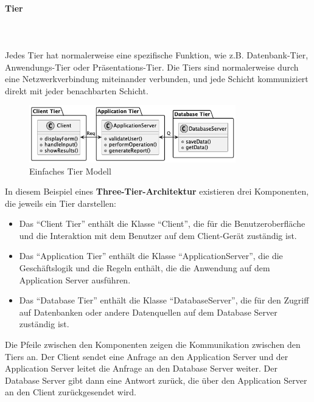 \documentclass[../vs-script-first-v01.tex]{subfiles}
\begin{document}
\paragraph{Tier}\mbox{}\\
\mbox{}\\
Jedes Tier hat normalerweise eine spezifische Funktion, wie z.B. Datenbank-Tier, Anwendungs-Tier oder Präsentations-Tier. Die Tiers sind normalerweise durch eine Netzwerkverbindung miteinander verbunden, und jede Schicht kommuniziert direkt mit jeder benachbarten Schicht.
\begin{figure}[!h]
  \centering
  \includegraphics[width=0.80\textwidth]{fig/uml/simple-tiers.png}
  \caption{Einfaches Tier Modell}
  \label{fig:simple-tier}
\end{figure}
In diesem Beispiel eines \textbf{Three-Tier-Architektur} existieren drei Komponenten, die jeweils ein Tier darstellen:
\begin{itemize}
\item Das \enquote{Client Tier} enthält die Klasse \enquote{Client}, die für die Benutzeroberfläche und die Interaktion mit dem Benutzer auf dem Client-Gerät zuständig ist.

\item Das \enquote{Application Tier} enthält die Klasse \enquote{ApplicationServer}, die die Geschäftslogik und die Regeln enthält, die die Anwendung auf dem Application Server ausführen.

\item Das \enquote{Database Tier} enthält die Klasse \enquote{DatabaseServer}, die für den Zugriff auf Datenbanken oder andere Datenquellen auf dem Database Server zuständig ist.
\end{itemize}
Die Pfeile zwischen den Komponenten zeigen die Kommunikation zwischen den Tiers an. Der Client sendet eine Anfrage an den Application Server und der Application Server leitet die Anfrage an den Database Server weiter. Der Database Server gibt dann eine Antwort zurück, die über den Application Server an den Client zurückgesendet wird.
\\
\end{document}
